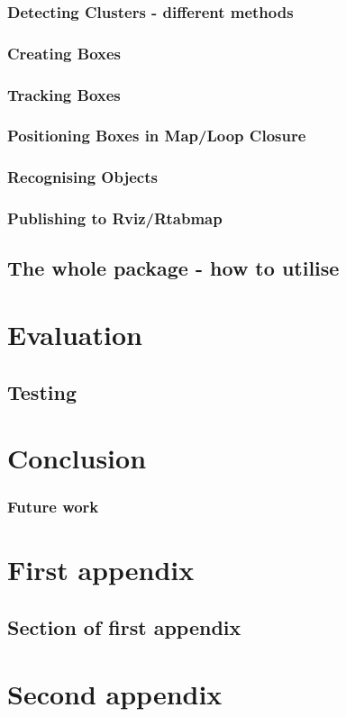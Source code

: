 \documentclass{mproj}
\begin{document}
\subsection{Detecting Clusters - different methods}
\subsection{Creating Boxes}
\subsection{Tracking Boxes}
\subsection{Positioning Boxes in Map/Loop Closure}
\subsection{Recognising Objects}
\subsection{Publishing to Rviz/Rtabmap}
\section{The whole package - how to utilise}
\chapter{Evaluation}
\section{Testing}

\chapter{Conclusion}\label{conclusion}
\subsection{Future work}

\appendix %
\chapter{First appendix}

\section{Section of first appendix}

\chapter{Second appendix}



\end{document}
